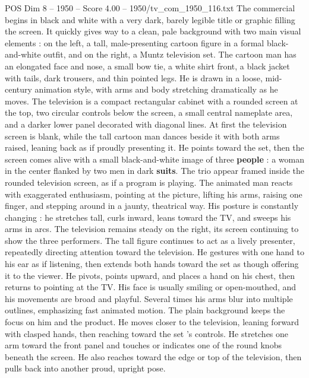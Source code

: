 \begin{textsample}{POS Dim 8 – 1950 – Score 4.00 – 1950/tv\_com\_1950\_116.txt}  \label{ex:f8_pos_076}
The commercial begins in black and white with a very dark, barely legible title or graphic filling the screen.
It quickly gives way to a clean, pale background with two main visual elements : on the left, a tall, male-presenting cartoon figure in a formal black-and-white outfit, and on the right, a Muntz television set.
The cartoon man has an elongated face and nose, a small bow tie, a white shirt front, a black jacket with tails, dark trousers, and thin pointed legs.
He is drawn in a loose, mid-century animation style, with arms and body stretching dramatically as he moves.
The television is a compact rectangular cabinet with a rounded screen at the top, two circular controls below the screen, a small central nameplate area, and a darker lower panel decorated with diagonal lines.
At first the television screen is blank, while the tall cartoon man dances beside it with both arms raised, leaning back as if proudly presenting it.
He points toward the set, then the screen comes alive with a small black-and-white image of three \textbf{people} : a woman in the center flanked by two men in dark \textbf{suits}.
The trio appear framed inside the rounded television screen, as if a program is playing.
The animated man reacts with exaggerated enthusiasm, pointing at the picture, lifting his arms, raising one finger, and stepping around in a jaunty, theatrical way.
His posture is constantly changing : he stretches tall, curls inward, leans toward the TV, and sweeps his arms in arcs.
The television remains steady on the right, its screen continuing to show the three performers.
The tall figure continues to act as a lively presenter, repeatedly directing attention toward the television.
He gestures with one hand to his ear as if listening, then extends both hands toward the set as though offering it to the viewer.
He pivots, points upward, and places a hand on his chest, then returns to pointing at the TV.
His face is usually smiling or open-mouthed, and his movements are broad and playful.
Several times his arms blur into multiple outlines, emphasizing fast animated motion.
The plain background keeps the focus on him and the product.
He moves closer to the television, leaning forward with clasped hands, then reaching toward the set ’s controls.
He stretches one arm toward the front panel and touches or indicates one of the round knobs beneath the screen.
He also reaches toward the edge or top of the television, then pulls back into another proud, upright pose.

\end{textsample}
